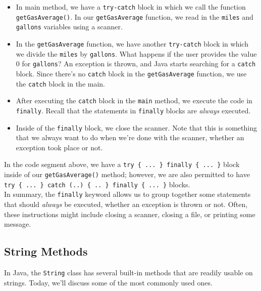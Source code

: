 \begin{itemize}
    \item In main method, we have a \verb!try-catch! block in which we call the function \verb!getGasAverage()!. In our \verb!getGasAverage! function, we read in the \verb!miles! and \verb!gallons! variables using a scanner.
    \item In the \verb!getGasAverage! function, we have another \verb!try-catch! block in which we divide the \verb!miles! by \verb!gallons!. What happens if the user provides the value $0$ for \verb!gallons!? An exception is thrown, and Java starts searching for a \verb!catch! block. Since there's no \verb!catch! block in the \verb!getGasAverage! function, we use the \verb!catch! block in the main.
    \item After executing the \verb!catch! block in the \verb!main! method, we execute the code in \verb!finally!. Recall that the statements in \verb!finally! blocks are \textit{always} executed. 
    \item Inside of the \verb!finally! block, we close the scanner. Note that this is something that we always want to do when we're done with the scanner, whether an exception took place or not. 
\end{itemize}

In the code segment above, we have a \verb!try { ... } finally { ... }! block inside of our \verb!getGasAverage()! method; however, we are also permitted to have \verb!try { ... } catch (..) { .. } finally { ... }! blocks. \\

In summary, the \verb!finally! keyword allows us to group together some statements that should \textit{always} be executed, whether an exception is thrown or not. Often, these instructions might include closing a scanner, closing a file, or printing some message.

\subsection{String Methods}

In Java, the \verb!String! class has several built-in methods that are readily usable on strings. Today, we'll discuss some of the most commonly used ones. 


